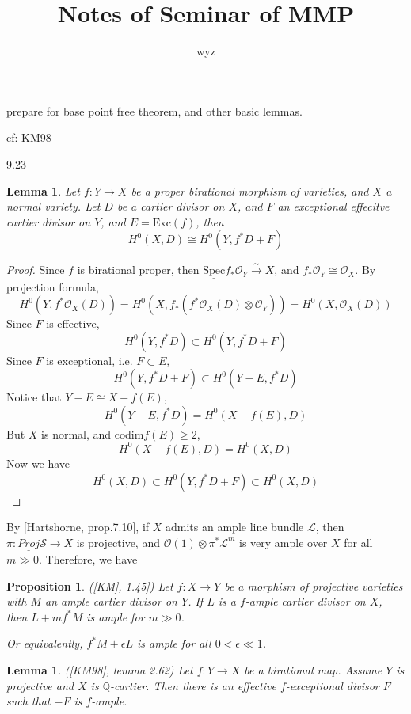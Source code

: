\documentclass{article}
\title{Notes of Seminar of MMP}
\author{wyz}
\date{}
\newtheorem{prop}[defn]{Proposition}
\newtheorem{lem}[defn]{Lemma}
\begin{document}
	\maketitle
prepare for base point free theorem, and other basic lemmas.

cf: KM98

9.23
\begin{lem}
	Let $ f:Y\to X $ be a proper birational morphism of varieties, and $ X $ a normal variety. Let $ D $ be a cartier divisor on $ X $, and $ F $ an exceptional effecitve cartier divisor on $ Y $, and $ E=\mathrm{Exc}(f) $, then 
	$$ H^0(X,D)\cong H^0(Y,f^*D+F) $$ 
\end{lem}
\begin{proof}
	Since $ f $ is birational proper, then $  \underline{\mathrm{Spec}}f_*\mathcal{O}_Y\xrightarrow{\sim}X $, and $ f_*\mathcal{O}_Y\cong \mathcal{O}_X $. By projection formula, 
	$$ H^0(Y,f^*\mathcal{O}_X(D))=H^0\left(X,f_*\left(f^*\mathcal{O}_X(D)\otimes \mathcal{O}_Y\right)\right)=H^0(X,\mathcal{O}_X(D))$$
	Since $ F $ is effective,
	$$ H^0(Y,f^*D)\subset H^0(Y,f^*D+F) $$
	Since $ F $ is exceptional, i.e. $ F\subset E $,
	$$ H^0(Y,f^*D+F)\subset H^0(Y-E,f^*D) $$
	Notice that $ Y-E\cong X-f(E)  $,
	$$ H^0(Y-E,f^*D)= H^0(X-f(E),D) $$
	But $ X $ is normal, and $ \mathrm{codim} f(E)\geqslant 2 $,
	$$  H^0(X-f(E),D) =H^0(X,D) $$
	Now we have 
	$$ H^0(X,D) \subset H^0(Y,f^*D+F)\subset H^0(X,D) $$
\end{proof}

By [Hartshorne, prop.7.10],  if $ X $ admits an ample line bundle $ \mathcal{L} $, then  $\pi: \underline{Proj}\mathcal{S}\to X $ is projective, and $ \mathcal{O}(1)\otimes \pi^*\mathcal{L}^m $ is very ample over $ X $  for all $ m\gg 0 $. Therefore, we have 
\begin{prop}
	([KM], 1.45]) Let $ f:X\to Y $ be a morphism of projective varieties with $ M $ an ample cartier divisor on $ Y $. If $ L $ is a $ f $-ample cartier divisor on $ X $, then $ L+mf^*M $ is ample for $ m\gg 0 $. 
	
	Or equivalently, $ f^*M+\epsilon L $ is ample for all $ 0<\epsilon \ll 1 $.
\end{prop}

\begin{lem}
	([KM98], lemma 2.62) Let $ f:Y\to X $ be a birational map. Assume  $ Y $ is projective and $ X $ is $ \mathbb{Q} $-cartier. Then there is an effective $ f $-exceptional divisor $ F $ such that $ -F $ is $ f $-ample. 
\end{lem}
\end{document}
